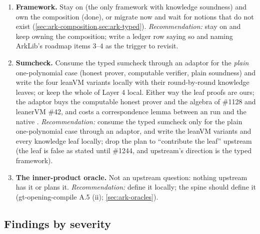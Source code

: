 \begin{enumerate}[label=(\arabic*)]
\item \textbf{Framework.} Stay on  (the only framework with knowledge
  soundness) and own the composition (done), or migrate now and wait for notions that do not
  exist (\cref{sec:ark-composition,sec:ark-typed}). \emph{Recommendation:} stay on
   and keep owning the composition; write a ledger row saying so and
  naming ArkLib's roadmap items 3--4 as the trigger to revisit.
\item \textbf{Sumcheck.} Consume the typed sumcheck through an adaptor for the \emph{plain}
  one-polynomial case (honest prover, computable verifier, plain soundness) and write the four
  leanVM variants locally with their round-by-round knowledge leaves; or keep the whole of
  Layer 4 local. Either way the leaf proofs are ours; the adaptor buys the computable honest
  prover and the algebra of \#1128 and leanerVM \#42, and costs a correspondence lemma between
  an  run and the native . \emph{Recommendation:} consume
  the typed sumcheck only for the plain one-polynomial case through an adaptor, and write the
  leanVM variants and every knowledge leaf locally; drop the plan to ``contribute the leaf''
  upstream (the leaf is false as stated until \#1244, and upstream's direction is the typed
  framework).
\item \textbf{The inner-product oracle.} Not an upstream question: nothing upstream has it or
  plans it. \emph{Recommendation:} define it locally; the spine should define it
  (gt-opening-compile A.5 (ii); \cref{sec:ark-oracles}).
\end{enumerate}

\subsection{Findings by severity}\label{sec:ark-findings-summary}

